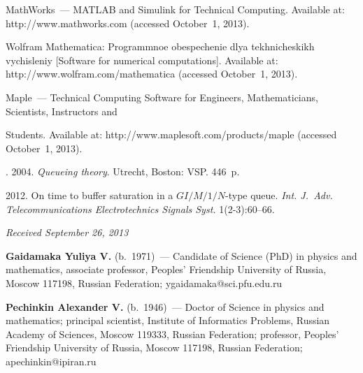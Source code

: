 \begin{multicols}{2}
{{\begin{thebibliography}{99}
MathWorks~--- MATLAB and Simulink for Technical
Computing. Available at: {\sf http://www.mathworks.com}
(accessed October~1, 2013).

Wolfram Mathematica: Programmnoe obespechenie dlya tekhnicheskikh vychisleniy
[Software for numerical computations].
Available at: {\sf http://www.\linebreak wolfram.com/mathematica} (accessed October~1, 2013).

Maple~--- Technical Computing Software for
Engineers, Mathematicians, Scientists,
Instructors and\linebreak\vspace*{-12pt}
\columnbreak

\noindent
 Students. Available at:
{\sf http://www.maplesoft.com/\linebreak products/maple} (accessed October~1, 2013).

. 2004.
\textit{Queueing theory}. Utrecht, Boston: VSP. 446~p.



 2012. On time to buffer saturation
in a $GI/M/1/N$-type queue. \textit{Int. J.~Adv.
Telecommunications Electrotechnics Signals
Syst.} 1(2-3):60--66.
\end{thebibliography}
} }





\end{multicols}

\hfill{\small\textit{Received September 26, 2013}}

\Contr

\noindent \textbf{Gaidamaka Yuliya V.} (b.\ 1971)~--- Candidate of Science 
(PhD) in physics and mathematics, associate professor, Peoples' Friendship 
University of Russia, Moscow 117198, Russian Federation; ygaidamaka@sci.pfu.edu.ru

\vspace*{3pt}

\noindent \textbf{Pechinkin Alexander V.} (b.\ 1946)~--- Doctor of Science in 
physics and mathematics; principal scientist, Institute of Informatics Problems, 
Russian Academy of Sciences, Moscow 119333, Russian Federation; 
professor, Peoples' Friendship University 
of Russia, Moscow 117198, Russian Federation; apechinkin@ipiran.ru

\vspace*{3pt}


